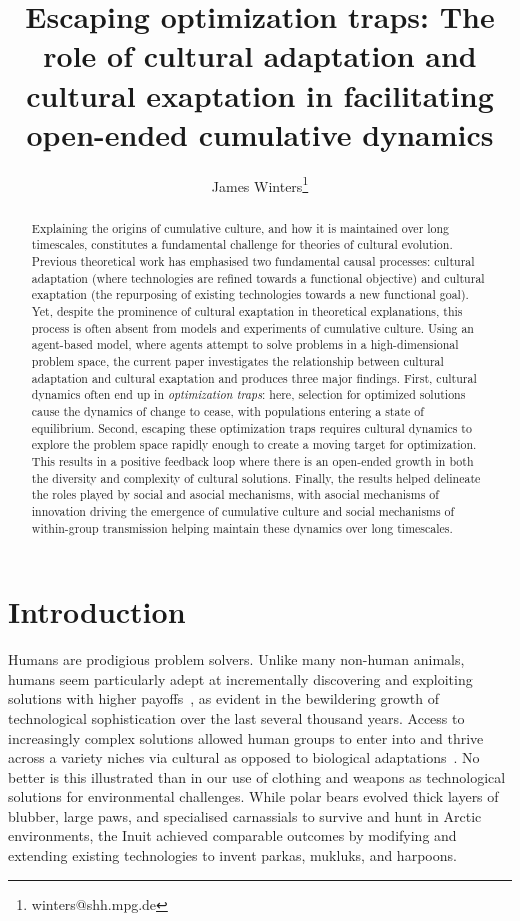 \documentclass{article}
\title{Escaping optimization traps: The role of cultural adaptation and cultural exaptation in facilitating open-ended cumulative dynamics}
\author[1]{James Winters\thanks{winters@shh.mpg.de}}
\affil[1]{Max Planck Institute for the Science of Human History, Germany}
\begin{document}
\maketitle

\begin{abstract}
    \noindent Explaining the origins of cumulative culture, and how it is maintained over long timescales, constitutes a fundamental challenge for theories of cultural evolution. Previous theoretical work has emphasised two fundamental causal processes: cultural adaptation (where technologies are refined towards a functional objective) and cultural exaptation (the repurposing of existing technologies towards a new functional goal). Yet, despite the prominence of cultural exaptation in theoretical explanations, this process is often absent from models and experiments of cumulative culture. Using an agent-based model, where agents attempt to solve problems in a high-dimensional problem space, the current paper investigates the relationship between cultural adaptation and cultural exaptation and produces three major findings. First, cultural dynamics often end up in {\em optimization traps}: here, selection for optimized solutions cause the dynamics of change to cease, with populations entering a state of equilibrium. Second, escaping these optimization traps requires cultural dynamics to explore the problem space rapidly enough to create a moving target for optimization. This results in a positive feedback loop where there is an open-ended growth in both the diversity and complexity of cultural solutions. Finally, the results helped delineate the roles played by social and asocial mechanisms, with asocial mechanisms of innovation driving the emergence of cumulative culture and social mechanisms of within-group transmission helping maintain these dynamics over long timescales.
\end{abstract}

\section{Introduction}
Humans are prodigious problem solvers. Unlike many non-human animals, humans seem particularly adept at incrementally discovering and exploiting solutions with higher payoffs~\cite{tennie_claudio_ratcheting_2009,acerbi_alberto_social_nodate}, as evident in the bewildering growth of technological sophistication over the last several thousand years. Access to increasingly complex solutions allowed human groups to enter into and thrive across a variety niches via cultural as opposed to biological adaptations~\cite{richerson_not_2008,henrich_secret_2015,laland_darwins_2018}. No better is this illustrated than in our use of clothing and weapons as technological solutions for environmental challenges. While polar bears evolved thick layers of blubber, large paws, and specialised carnassials to survive and hunt in Arctic environments, the Inuit achieved comparable outcomes by modifying and extending existing technologies to invent parkas, mukluks, and harpoons.
\end{document}
